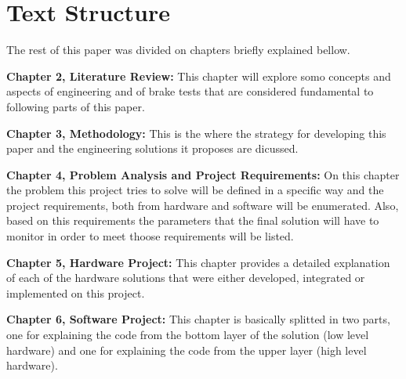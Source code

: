 	\section{Text Structure}\label{sec:text-structure}
	
	The rest of this paper was divided on chapters briefly explained bellow.
	
	\textbf{Chapter 2, Literature Review: } This chapter will explore somo concepts and aspects of engineering and of brake tests that are considered fundamental to following parts of this paper.
	\par
	
	\textbf{Chapter 3, Methodology: }
	This is the where the strategy for developing this paper and the engineering solutions it proposes are dicussed.
	\par
	
	\textbf{Chapter 4, Problem Analysis and Project Requirements: }
	On this chapter the problem this project tries to solve will be defined in a specific way and the project requirements, both from hardware and software will be enumerated. Also, based on this requirements the parameters that the final solution will have to monitor in order to meet thoose requirements will be listed.
	\par
	
	\textbf{Chapter 5, Hardware Project: }
	This chapter provides a detailed explanation of each of the hardware solutions that were either developed, integrated or implemented on this project.
	\par
	
	\textbf{Chapter 6, Software Project: }
	This chapter is basically splitted in two parts, one for explaining the code from the bottom layer of the solution (low level hardware) and one for explaining the code from the upper layer (high level hardware).
	\par